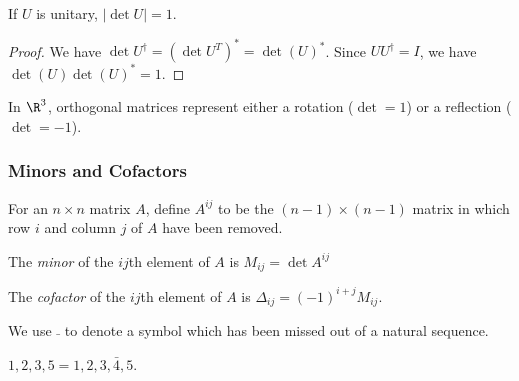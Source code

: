 \documentclass[a4paper]{article}
\begin{document}
\begin{cor}
  If $U$ is unitary, $|\det U| = 1$.
\end{cor}

\begin{proof}
  We have $\det U^\dagger = (\det U^T)^* = \det(U)^*$. Since $UU^\dagger = I$, we have $\det(U)\det(U)^* = 1$.
\end{proof}

\begin{prop}
  In $\R^3$, orthogonal matrices represent either a rotation ($\det = 1$) or a reflection ($\det = -1$).
\end{prop}
\subsubsection{Minors and Cofactors}
\begin{defi}
  For an $n\times n$ matrix $A$, define $A^{ij}$ to be the $(n - 1)\times (n - 1)$ matrix in which row $i$ and column $j$ of $A$ have been removed.

  The \emph{minor} of the $ij$th element of $A$ is $M_{ij} = \det A^{ij}$

  The \emph{cofactor} of the $ij$th element of $A$ is $\Delta_{ij} = (-1)^{i + j}M_{ij}$.
\end{defi}

\begin{notation}
  We use $\bar \;$ to denote a symbol which has been missed out of a natural sequence.
\end{notation}
\begin{eg}
  $1, 2, 3, 5 = 1, 2, 3, \bar 4, 5$.
\end{eg}
\end{document}
